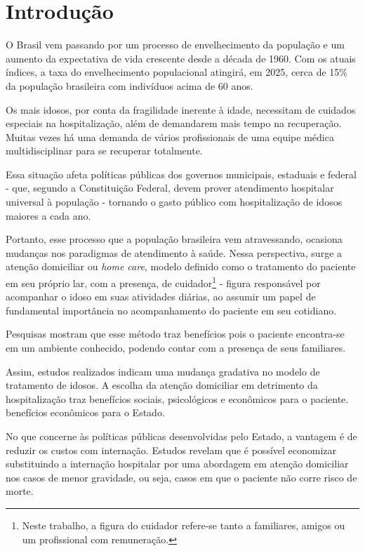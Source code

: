 \chapter{Introdução}\label{cap:introducao}

O Brasil vem passando por um processo de envelhecimento da população e
um aumento da expectativa de vida crescente desde a década de 1960. 
Com os atuais índices, a taxa do envelhecimento populacional atingirá, 
em 2025, cerca de 15\% da população brasileira com indivíduos acima 
de 60 anos. 

Os mais idosos, por conta da fragilidade inerente à idade, necessitam de 
cuidados especiais na hospitalização, além de demandarem mais tempo na 
recuperação. Muitas vezes há uma demanda de vários profissionais de uma equipe 
médica multidisciplinar para se recuperar totalmente.

Essa situação afeta políticas públicas dos governos municipais, estaduais e
federal - que, segundo a Constituição Federal, devem prover atendimento
hospitalar universal à população - tornando o gasto público com hospitalização
de idosos maiores a cada ano.

Portanto, esse processo que a população brasileira vem atravessando, ocasiona
mudanças  nos paradigmas de atendimento à saúde. Nessa perspectiva, surge a
atenção domiciliar %
ou \textit{home care}, modelo definido como o tratamento do paciente
em seu próprio lar, com a presença, de cuidador\footnote{Neste trabalho, a
figura do cuidador refere-se tanto a familiares, amigos ou um profissional com
remuneração.} - figura responsável por acompanhar o idoso em suas atividades
diárias, ao assumir um papel de fundamental importância no acompanhamento do
paciente em seu cotidiano.

Pesquisas mostram que esse método traz benefícios pois o  paciente encontra-se
em um ambiente conhecido, podendo contar com a presença de seus familiares.

Assim, estudos realizados indicam uma mudança gradativa no modelo de tratamento
de idosos. A escolha da atenção domiciliar em detrimento da hospitalização traz
benefícios sociais, psicológicos e econômicos para o paciente. %
benefícios econômicos para o Estado.

No que concerne às políticas públicas desenvolvidas pelo Estado,  a vantagem é
de reduzir os custos com internação. Estudos revelam  que é possível economizar
substituindo a internação hospitalar por uma  abordagem em atenção domiciliar
nos casos de menor gravidade,  ou seja, casos em que o paciente não corre risco
de morte.  %

